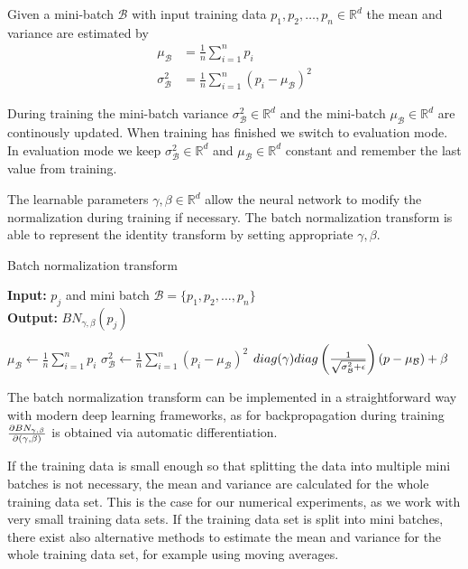 \documentclass[twoside,a4paper]{article}
\begin{document}
Given a mini-batch $\mathcal{B}$ with input training data $p_1, p_2, \dots, p_n \in \mathbb{R}^{d}$ the
mean and variance are estimated by
\begin{align*}
	\mu_\mathcal{B} &= \frac{1}{n} \sum_{i=1}^{n} p_i \\
	\sigma^2_\mathcal{B} &= \frac{1}{n} \sum_{i=1}^n (p_i - \mu_\mathcal{B})^2
\end{align*}

During training the mini-batch variance $\sigma^2_\mathcal{B} \in \mathbb{R}^{d}$ and
the mini-batch $\mu_\mathcal{B} \in \mathbb{R}^{d}$ are continously updated.
When training has finished we switch to evaluation mode. In evaluation mode we keep
$\sigma^2_\mathcal{B} \in \mathbb{R}^{d}$ and $\mu_\mathcal{B} \in \mathbb{R}^{d}$ constant
and remember the last value from training.

The learnable parameters $\gamma, \beta \in \mathbb{R}^{d}$ allow the neural network to modify
the normalization during training if necessary. The batch normalization transform is able to 
represent the identity transform by setting appropriate $\gamma, \beta$.

\begin{algorithm}
	\caption{Batch normalization transform}
	\textbf{Input:} $p_j$ and mini batch $\mathcal{B} = \{p_1, p_2, \dots, p_n\}$  \\
	\textbf{Output:} $BN_{\gamma, \beta}(p_j)$
	\begin{algorithmic}
		 
			\State $\mu_\mathcal{B} \gets \frac{1}{n} \sum_{i=1}^{n} p_i$
			\State $\sigma^2_\mathcal{B} \gets \frac{1}{n} \sum_{i=1}^n (p_i - \mu_\mathcal{B})^2$
		\EndIf
		\State \Return 
		$diag(\gamma)diag\left( \frac{1}{\sqrt{\sigma^2_\mathcal{B} + \epsilon}} \right) 
		(p-\mu_\mathcal{B}) + \beta$
	\end{algorithmic}
\end{algorithm}

The batch normalization transform can be implemented in a straightforward way with modern
deep learning frameworks, as for backpropagation during training 
$\frac{\partial BN_{\gamma, \beta}}{\partial (\gamma, \beta)}$ is obtained via automatic differentiation.

If the training data is small enough so that splitting the data into multiple mini batches
is not necessary, the mean and variance are calculated for the whole training data set. This is the
case for our numerical experiments, as we work with very small training data sets.
If the training data set is split into mini batches, there exist also alternative methods to estimate
the mean and variance for the whole training data set, for example using moving averages.
\end{document}
